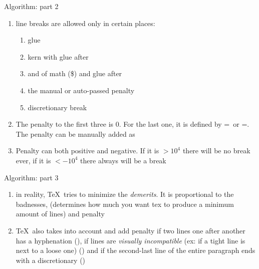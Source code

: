 \begin{frame}{Algorithm: part 2\magicPage}\relax

    \begin{enumerate}
        \item line breaks are allowed only in certain places:
        \begin{enumerate}
            \item glue
            \item kern with glue after 
            \item and of math (\$) and glue after 
            \item the manual or auto-passed penalty
            \item  discretionary break
        \end{enumerate}
        \item The penalty to the first three is $0$. For the last one, it is defined by \ccol\hyphenpenalty=\ or \ccol\exhyphenpenalty=. The penalty can be manually added as \ccol\penalty
        \item Penalty can both positive and negative. If it is $>10^4$ there will be no break ever, if it is $<-10^4$ there always will be a break
         
    \end{enumerate}
         
\end{frame}


\begin{frame}{Algorithm: part 3\magicPage}\relax
    
    \begin{enumerate}
    \item in reality, \TeX\ tries to minimize the \textit{demerits}. It is proportional to the {\csk badnesses}, \ccol\linepenalty (determines how much you want tex to produce a minimum amount of lines) and {\csk penalty}
    \item \TeX\ also takes into account and add penalty if two lines one after another has a hyphenation (\ccol\doublehyphendemerits), if lines are \textit{visually incompatible} (ex: if a tight line is next to a loose one) (\ccol\adjdemerits) and if the second-last line of the entire paragraph ends with a discretionary (\ccol\finalhyphendemerits)
    
    \end{enumerate}
         
\end{frame}

